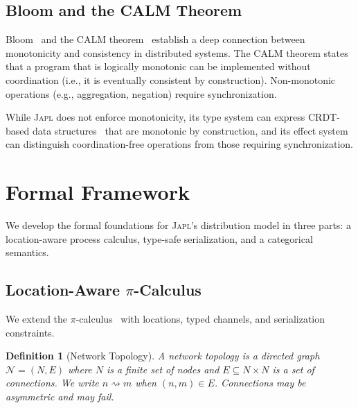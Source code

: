 \documentclass[11pt,a4paper]{article}
\newtheorem{definition}[theorem]{Definition}
\newcommand{\japl}{\textsc{Japl}}
\newcommand{\catN}{\mathcal{N}}
\begin{document}
\subsection{Bloom and the CALM Theorem}

Bloom~\citep{alvaro2011consistency,conway2012logic} and the CALM
theorem~\citep{hellerstein2010declarative} establish a deep connection
between monotonicity and consistency in distributed systems. The CALM
theorem states that a program that is logically monotonic can be
implemented without coordination (i.e., it is eventually consistent
by construction). Non-monotonic operations (e.g., aggregation, negation)
require synchronization.

While \japl{} does not enforce monotonicity, its type system can express
CRDT-based data structures~\citep{shapiro2011comprehensive} that are
monotonic by construction, and its effect system can distinguish
coordination-free operations from those requiring synchronization.


\section{Formal Framework}
\label{sec:formal}

We develop the formal foundations for \japl{}'s distribution model in three
parts: a location-aware process calculus, type-safe serialization, and a
categorical semantics.

\subsection{Location-Aware $\pi$-Calculus}

We extend the $\pi$-calculus~\citep{milner1999communicating,sangiorgi2001pi}
with locations, typed channels, and serialization constraints.

\begin{definition}[Network Topology]
A \emph{network topology} is a directed graph $\catN = (N, E)$ where $N$ is
a finite set of \emph{nodes} and $E \subseteq N \times N$ is a set of
\emph{connections}. We write $n \rightsquigarrow m$ when $(n, m) \in E$.
Connections may be asymmetric and may fail.
\end{definition}
\end{document}
